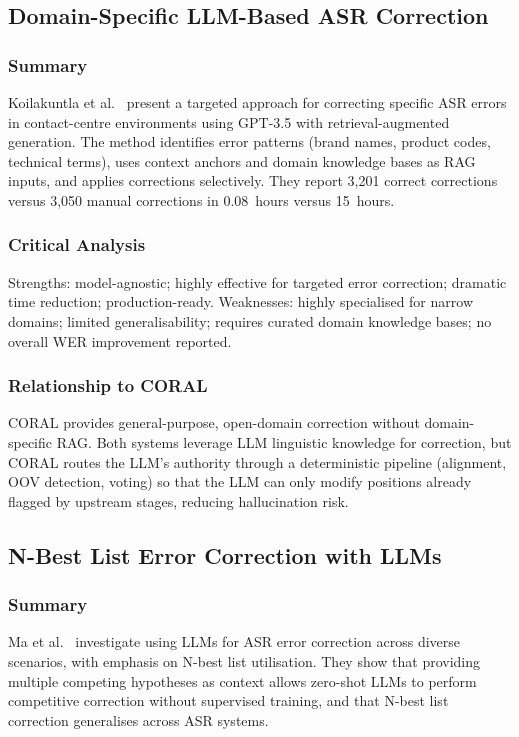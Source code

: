 \subsection{Domain-Specific LLM-Based ASR Correction}
\label{ssec:lit-koilakuntla}

\subsubsection{Summary}
Koilakuntla et al.~\cite{koilakuntla2024llm} present a targeted approach for correcting specific ASR errors in contact-centre environments using GPT-3.5 with retrieval-augmented generation. The method identifies error patterns (brand names, product codes, technical terms), uses context anchors and domain knowledge bases as RAG inputs, and applies corrections selectively. They report 3{,}201 correct corrections versus 3{,}050 manual corrections in 0.08~hours versus 15~hours.

\subsubsection{Critical Analysis}
Strengths: model-agnostic; highly effective for targeted error correction; dramatic time reduction; production-ready. Weaknesses: highly specialised for narrow domains; limited generalisability; requires curated domain knowledge bases; no overall WER improvement reported.

\subsubsection{Relationship to CORAL}
CORAL provides general-purpose, open-domain correction without domain-specific RAG. Both systems leverage LLM linguistic knowledge for correction, but CORAL routes the LLM's authority through a deterministic pipeline (alignment, OOV detection, voting) so that the LLM can only modify positions already flagged by upstream stages, reducing hallucination risk.

\subsection{N-Best List Error Correction with LLMs}
\label{ssec:lit-ma}

\subsubsection{Summary}
Ma et al.~\cite{ma2024asr} investigate using LLMs for ASR error correction across diverse scenarios, with emphasis on N-best list utilisation. They show that providing multiple competing hypotheses as context allows zero-shot LLMs to perform competitive correction without supervised training, and that N-best list correction generalises across ASR systems.


